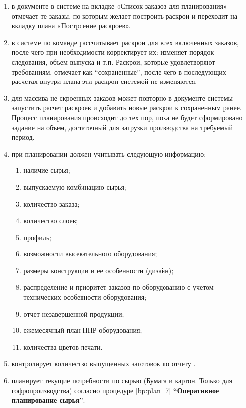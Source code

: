 \begin{enumerate}
\item \planner в документе  в системе \gofro на вкладке «Список заказов для планирования»  отмечает те заказы, по которым желает построить раскрои и переходит на вкладку плана «Построение раскроев».
\item \planner в системе \gofro по команде  рассчитывает раскрои для всех включенных заказов, после чего \planner при необходимости корректирует их: изменяет порядок следования, объем выпуска и т.п. Раскрои, которые удовлетворяют требованиям, \planner отмечает как “сохраненные”, после чего в последующих расчетах внутри плана эти раскрои системой \gofro не изменяются.
\item	 \planner для массива не скроенных заказов может повторно в документе  системы \gofro запустить расчет раскроев и добавить новые раскрои к сохраненным ранее. Процесс планирования происходит до тех пор, пока не будет сформировано задание на объем, достаточный для загрузки производства на требуемый период.
\item	\planner при планировании  должен учитывать следующую информацию:
\begin{enumerate}
    \item наличие сырья;
    \item выпускаемую комбинацию сырья;
    \item количество заказа;
    \item количество слоев;
    \item профиль;
    \item возможности высекательного оборудования;
    \item размеры конструкции и ее особенности (дизайн);
    \item распределение и приоритет заказов по оборудованию с учетом технических особенности оборудования;
    \item отчет незавершенной продукции;
    \item ежемесячный план ППР оборудования;
    \item количества цветов печати.
\end{enumerate}
\item	\planner контролирует количество выпущенных заготовок по отчету .
\item	\planner планирует текущие потребности по сырью (Бумага и картон. Только для гофропроизводства) согласно процедуре  \ref{bp:plan_7} \textbf{“Оперативное планирование сырья”}.

\end{enumerate}
